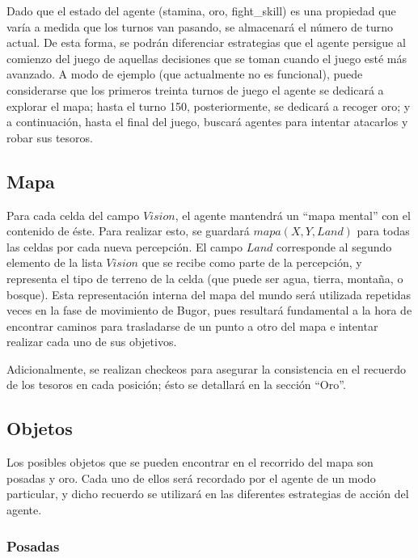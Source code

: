 \documentclass[a4paper,10pt,spanish]{article}
\begin{document}
	Dado que el estado del agente (stamina, oro, fight\_skill) es una propiedad que var\'ia a medida que los turnos van pasando, se almacenar\'a el n\'umero de turno actual. De esta forma, se podr\'an diferenciar estrategias que el agente persigue al comienzo del juego de aquellas decisiones que se toman cuando el juego est\'e m\'as avanzado. A modo de ejemplo (que actualmente no es funcional), puede considerarse que los primeros treinta turnos de juego el agente se dedicar\'a a explorar el mapa; hasta el turno 150, posteriormente, se dedicar\'a a recoger oro; y a continuaci\'on, hasta el final del juego, buscar\'a agentes para intentar atacarlos y robar sus tesoros.
	
	\subsection{Mapa}
	
	Para cada celda del campo $Vision$, el agente mantendr\'a un ``mapa mental'' con el contenido de \'este. Para realizar esto, se guardar\'a $mapa(X, Y, Land)$ para todas las celdas por cada nueva percepci\'on. El campo $Land$ corresponde al segundo elemento de la lista $Vision$ que se recibe como parte de la percepci\'on, y representa el tipo de terreno de la celda (que puede ser agua, tierra, monta\~na, o bosque). Esta representaci\'on interna del mapa del mundo ser\'a utilizada repetidas veces en la fase de movimiento de Bugor, pues resultar\'a fundamental a la hora de encontrar caminos para trasladarse de un punto a otro del mapa e intentar realizar cada uno de sus objetivos.
	
	Adicionalmente, se realizan checkeos para asegurar la consistencia en el recuerdo de los tesoros en cada posici\'on; \'esto se detallar\'a en la secci\'on ``Oro''.

	\subsection{Objetos}
	
	Los posibles objetos que se pueden encontrar en el recorrido del mapa son posadas y oro. Cada uno de ellos ser\'a recordado por el agente de un modo particular, y dicho recuerdo se utilizar\'a en las diferentes estrategias de acci\'on del agente.
	
		\subsubsection{Posadas}
		
\end{document}
